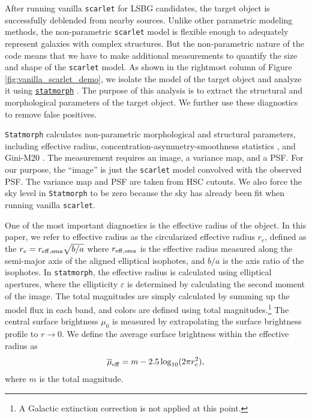 \documentclass[twocolumn,astrosymb,twocolappendix]{aastex631}
\newcommand{\code}[1]{\texttt{#1}}
\begin{document}
\begin{CJK*}{UTF8}{gbsn}
After running vanilla \code{scarlet} for LSBG candidates, the target object is successfully deblended from nearby sources. Unlike other parametric modeling methods, the non-parametric \code{scarlet} model is flexible enough to adequately represent galaxies with complex structures. But the non-parametric nature of the code means that we have to make additional measurements to quantify the size and shape of the \code{scarlet} model. As shown in the rightmost column of Figure \ref{fig:vanilla_scarlet_demo}, we isolate the model of the target object and analyze it using \href{https://statmorph.readthedocs.io/en/latest/}{\code{statmorph}} \citep{statmorph}. The purpose of this analysis is to extract the structural and morphological parameters of the target object. We further use these diagnostics to remove false positives. 

\code{Statmorph} calculates non-parametric morphological and structural parameters, including effective radius, concentration-asymmetry-smoothness statistics \citep[CAS,][]{Conselice2003}, and Gini-M20 \citep{Abraham2003,Lotz2004}. The measurement requires an image, a variance map, and a PSF. For our purpose, the ``image'' is just the \code{scarlet} model convolved with the observed PSF. The variance map and PSF are taken from HSC cutouts. We also force the sky level in \code{Statmorph} to be zero because the sky has already been fit when running vanilla \code{scarlet}. 

One of the most important diagnostics is the effective radius of the object. In this paper, we refer to effective radius as the circularized effective radius $r_{e}$, defined as the $r_{e} = r_{\rm eff, sma} \sqrt{b/a}$ where $r_{\rm eff, sma}$ is the effective radius measured along the semi-major axis of the aligned elliptical isophotes, and $b/a$ is the axis ratio of the isophotes. In \code{statmorph}, the effective radius is calculated using elliptical apertures, where the ellipticity $\varepsilon$ is determined by calculating the second moment of the image. The total magnitudes are simply calculated by summing up the model flux in each band, and colors are defined using total magnitudes.\footnote{A Galactic extinction correction is not applied at this point.} The central surface brightness $\mu_0$ is measured by extrapolating the surface brightness profile to $r\to 0$. We define the average surface brightness within the effective radius as 
\begin{equation}\label{eq:mu_eff}
    \overline{\mu}_{\rm eff} = m - 2.5 \log_{10}(2 \pi r_e^2),
\end{equation}
where $m$ is the total magnitude. 


\end{CJK*}
\end{document}
